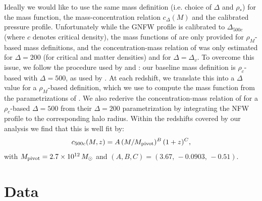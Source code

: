 \documentclass[useAMS,usenatbib]{mn2e}
\begin{document}
      Ideally we would like to use the same mass definition (i.e. choice of $\Delta$ and $\rho_*$) for the mass function, the mass-concentration relation $c_\Delta(M)$ and the calibrated pressure profile. Unfortunately while the GNFW profile is calibrated to $\Delta_{500c}$ (where $c$ denotes critical density), the mass functions of \cite{2008ApJ...688..709T,2010ApJ...724..878T} are only provided for $\rho_M$-based mass definitions, and the concentration-mass relation of \cite{2008MNRAS.390L..64D} was only estimated for $\Delta=200$ (for critical and matter densities) and for $\Delta=\Delta_v$. To overcome this issue, we follow the procedure used by \cite{2016A&A...594A..24P} and \cite{2018MNRAS.477.4957B}: our baseline mass definition is $\rho_c$-based with $\Delta=500$, as used by \cite{2010A&A...517A..92A}. At each redshift, we translate this into a $\Delta$ value for a $\rho_M$-based definition, which we use to compute the mass function from the parametrizations of \cite{2008ApJ...688..709T,2010ApJ...724..878T}. We also rederive the concentration-mass relation of \cite{2008MNRAS.390L..64D} for a $\rho_c$-based $\Delta=500$ from their $\Delta=200$ parametrization by integrating the NFW profile to the corresponding halo radius. Within the redshifts covered by our analysis we find that this is well fit by:
      \begin{equation}
        c_{500c}(M,z)= A\,(M/M_{\rm pivot})^B\,(1+z)^C,
      \end{equation}
      with $M_{\rm pivot}=2.7\times10^{12}\,M_\odot$ and $(A,B,C)=(3.67,\,-0.0903,\,-0.51)$.

\section{Data}\label{sec:data}
\end{document}
